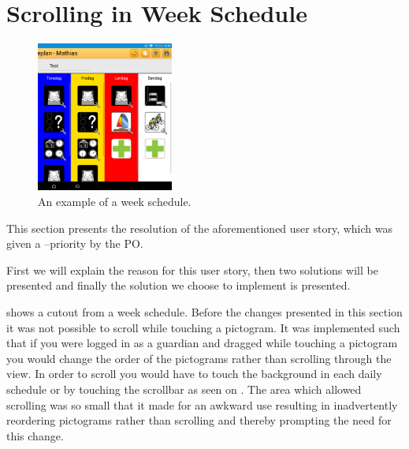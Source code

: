 \section{Scrolling in Week Schedule}

\begin{figure} 
    \centering
        \includegraphics[width=0.4\textwidth]{figures/img/screenshots/weekplan_schedule.png}
    \caption{An example of a week schedule.}
    \label{fig:weekschedule}
    \vspace{-20pt}
\end{figure}

This section presents the resolution of the aforementioned user story, which was given a \phigh--priority by the PO.

First we will explain the reason for this user story, then two solutions will be presented and finally the solution we choose to implement is presented. 

 shows a cutout from a week schedule. 
Before the changes presented in this section it was not possible to scroll while touching a pictogram. 
It was implemented such that if you were logged in as a guardian and dragged while touching a pictogram you would change the order of the pictograms rather than scrolling through the view.
In order to scroll you would have to touch the background in each daily schedule or by touching the scrollbar as seen on .
The area which allowed scrolling was so small that it made for an awkward use resulting in inadvertently reordering pictograms rather than scrolling and thereby prompting the need for this change.

